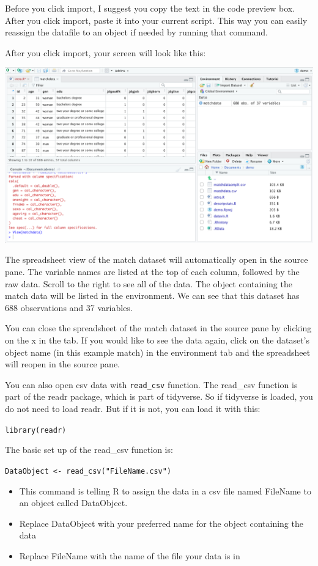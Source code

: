 \documentclass[
]{book}
\providecommand{\tightlist}{%
  \setlength{\itemsep}{0pt}\setlength{\parskip}{0pt}}
\begin{document}
Before you click import, I suggest you copy the text in the code preview box. After you click import, paste it into your current script. This way you can easily reassign the datafile to an object if needed by running that command.

After you click import, your screen will look like this:

\includegraphics{img/DATA THINGS 1R9.png}

The spreadsheet view of the match dataset will automatically open in the source pane. The variable names are listed at the top of each column, followed by the raw data. Scroll to the right to see all of the data. The object containing the match data will be listed in the environment. We can see that this dataset has 688 observations and 37 variables.

You can close the spreadsheet of the match dataset in the source pane by clicking on the x in the tab. If you would like to see the data again, click on the dataset's object name (in this example match) in the environment tab and the spreadsheet will reopen in the source pane.

You can also open csv data with \texttt{read\_csv} function. The read\_csv function is part of the readr package, which is part of tidyverse. So if tidyverse is loaded, you do not need to load readr. But if it is not, you can load it with this:

\texttt{library(readr)}

The basic set up of the read\_csv function is:

\texttt{DataObject\ \textless{}-\ read\_csv("FileName.csv")}

\begin{itemize}
\tightlist
\item
  This command is telling R to assign the data in a csv file named FileName to an object called DataObject.\\
\item
  Replace DataObject with your preferred name for the object containing the data\\
\item
  Replace FileName with the name of the file your data is in
\end{itemize}
\end{document}
